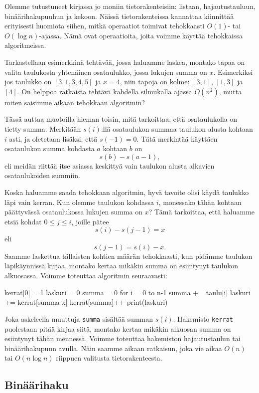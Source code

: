 Olemme tutustuneet kirjassa jo moniin tietorakenteisiin:
listaan, hajautustauluun, binäärihakupuuhun ja kekoon.
Näissä tietorakenteissa kannattaa kiinnittää erityisesti huomiota siihen,
mitkä operaatiot toimivat tehokkaasti $O(1)$- tai $O(\log n)$-ajassa.
Nämä ovat operaatioita, joita voimme käyttää tehokkaissa algoritmeissa.

Tarkastellaan esimerkkinä tehtävää, jossa haluamme laskea,
montako tapaa on valita taulukosta yhtenäinen osataulukko,
jossa lukujen summa on $x$.
Esimerkiksi jos taulukko on $[3,1,3,4,5]$ ja $x=4$,
niin tapoja on kolme: $[3,1]$, $[1,3]$ ja $[4]$.
On helppoa ratkaista tehtävä kahdella silmukalla ajassa $O(n^2)$,
mutta miten saisimme aikaan tehokkaan algoritmin?

Tässä auttaa muotoilla hieman toisin, mitä tarkoittaa,
että osataulukolla on tietty summa.
Merkitään $s(i)$:llä osataulukon summaa taulukon alusta
kohtaan $i$ asti, ja oletetaan lisäksi, että $s(-1)=0$.
Tätä merkintää käyttäen osataulukon summa
kohdasta $a$ kohtaan $b$ on
\[s(b)-s(a-1),\]
eli meidän riittää itse asiassa keskittyä vain taulukon alusta
alkavien osataulukoiden summiin.

Koska haluamme saada tehokkaan algoritmin,
hyvä tavoite olisi käydä taulukko läpi vain kerran.
Kun olemme taulukon kohdassa $i$,
monessako tähän kohtaan päättyvässä osataulukossa
lukujen summa on $x$?
Tämä tarkoittaa, että haluamme etsiä kohdat $0 \le j \le i$,
joille pätee
\[s(i)-s(j-1)=x\]
eli
\[s(j-1)=s(i)-x.\]
Saamme laskettua tällaisten kohtien määrän tehokkaasti,
kun pidämme taulukon läpikäynnissä kirjaa,
montako kertaa mikäkin summa on esiintynyt taulukon alkuosassa.
Voimme toteuttaa algoritmin seuraavasti:

\begin{code}
kerrat[0] = 1
laskuri = 0
summa = 0
for i = 0 to n-1
    summa += taulu[i]
    laskuri += kerrat[summa-x]
    kerrat[summa]++
print(laskuri)
\end{code}

Joka askeleella muuttuja \texttt{summa} sisältää
summan $s(i)$.
Hakemisto \texttt{kerrat} puolestaan pitää kirjaa siitä,
montako kertaa mikäkin alkuosan summa on esiintynyt tähän mennessä.
Voimme toteuttaa hakemiston hajautustaulun tai
binäärihakupuun avulla.
Näin saamme aikaan ratkaisun, joka vie aikaa $O(n)$ tai $O(n \log n)$
riippuen valitusta tietorakenteesta.

\subsection{Binäärihaku}

